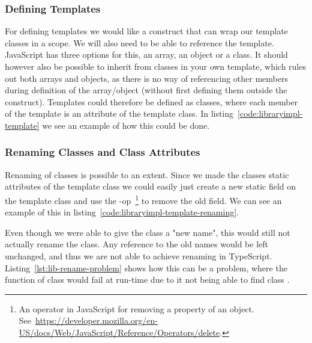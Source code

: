\subsubsection{Defining Templates}\label{subsubsec:defining-templates}

For defining templates we would like a construct that can wrap our template classes in a scope.
We will also need to be able to reference the template.
JavaScript has three options for this, an array, an object or a class.
It should however also be possible to inherit from classes in your own template, which rules out both arrays and objects, as there is no way of referencing other members during definition of the array/object (without first defining them outside the construct).
Templates could therefore be defined as classes, where each member of the template is an attribute of the template class.
In listing~\vref{code:libraryimpl-template} we see an example of how this could be done.


\subsubsection{Renaming Classes and Class Attributes}\label{subsubsec:renaming-classes-and-class-attributes}

Renaming of classes is possible to an extent.
Since we made the classes static attributes of the template class we could easily just create a new static field on the template class and use the -op~\footnote{An operator in JavaScript for removing a property of an object. See~\url{https://developer.mozilla.org/en-US/docs/Web/JavaScript/Reference/Operators/delete}.} to remove the old field.
We can see an example of this in listing~\vref{code:libraryimpl-template-renaming}.



Even though we were able to give the class a "new name", this would still not actually rename the class.
Any reference to the old names would be left unchanged, and thus we are not able to achieve renaming in TypeScript.
Listing~\vref{lst:lib-rename-problem} shows how this can be a problem, where the function  of class  would fail at run-time due to it not being able to find class .

